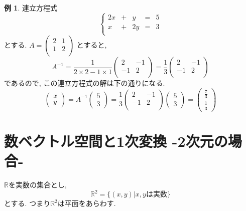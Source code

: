 \documentclass[dvipdfmx,a4paper,11pt]{article}
\newcommand{\R}{\mathbb{R}}
\theoremstyle{definition}
\newtheorem{exa}[thm]{例}
\begin{document}
 
   \begin{exa}
   連立方程式
$$
 \left\{ 
\begin{matrix}
2x&+&y&= &5\\
x&+&2y&= &3\\
\end{matrix}
\right.
$$
とする. 
$A=
  \begin{pmatrix}
 2& 1  \\
 1& 2  \\
 \end{pmatrix} 
 $
とすると, 
$$
A^{-1}
=
  \frac{1}{2\times 2-1 \times 1}
 \begin{pmatrix}
 2& -1  \\
 -1& 2  \\
 \end{pmatrix} 
 =
   \frac{1}{3}
 \begin{pmatrix}
 2& -1  \\
 -1& 2  \\
 \end{pmatrix} 
$$
であるので, この連立方程式の解は下の通りになる.
$$
 \begin{pmatrix}
 x \\
 y
 \end{pmatrix} 
 = A^{-1}
  \begin{pmatrix}
5 \\
 3
 \end{pmatrix} 
 =
   \frac{1}{3}
 \begin{pmatrix}
 2& -1  \\
 -1& 2  \\
 \end{pmatrix} 
  \begin{pmatrix}
5 \\
 3
 \end{pmatrix} 
 =
   \begin{pmatrix}
\frac{7}{3} \\
\frac{1}{3}
 \end{pmatrix} 
 $$


  \end{exa}
 
 
 
 
 
\newpage

\section{数ベクトル空間と1次変換 -2次元の場合-}
\label{sec-3}
$\R$を実数の集合とし, 
$$
\R^2  = \{ (x, y) | \text{$x,y$は実数}\} 
$$
とする. 
つまり$\R^2$は平面をあらわす.
\end{document}
